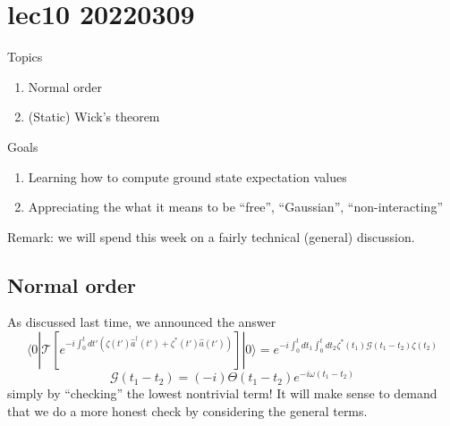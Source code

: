 \chapter{lec10 20220309}

Topics

\begin{enumerate}
    \item Normal order
    \item (Static) Wick's theorem
\end{enumerate}

Goals

\begin{enumerate}
    \item Learning how to compute ground state expectation values
    \item Appreciating the what it means to be ``free'', ``Gaussian'', ``non-interacting''
\end{enumerate}

Remark: we will spend this week on a fairly technical (general) discussion.

\section{Normal order}

As discussed last time, we announced the answer
\[ \langle 0|\mathcal{T} \left[ e^{-i\int_0^t{dt'\left( \zeta \left( t' \right) \hat{a}^{\dagger}\left( t' \right) +\zeta ^*\left( t' \right) \hat{a}\left( t' \right) \right)}} \right] |0\rangle =e^{-i\int_0^t{dt_1\int_0^t{dt_2\zeta ^*\left( t_1 \right) \mathscr{G} \left( t_1-t_2 \right) \zeta \left( t_2 \right)}}}\]
\[ \mathscr{G} \left( t_1-t_2 \right) =(-i)\Theta \left( t_1-t_2 \right) e^{-i\omega \left( t_1-t_2 \right)}\]
simply by ``checking'' the lowest nontrivial term! It will make sense to demand that we do a more honest check by considering the general terms.

